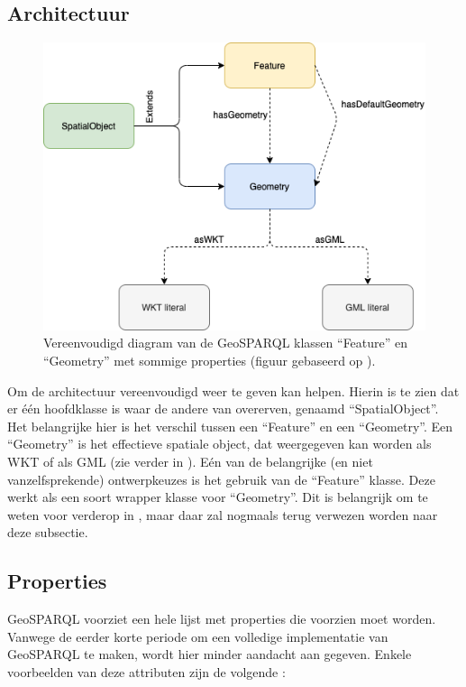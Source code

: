 \subsection{Architectuur}
\label{subsec:geosparql_architecture}
\begin{figure}[ht]
    \centering
    \includegraphics[width=0.7\linewidth]{images/geosparql_architecture.png}
    \caption{Vereenvoudigd diagram van de GeoSPARQL klassen ``Feature'' en ``Geometry'' met sommige properties (figuur gebaseerd op \cite{geosparqlsupport}).}
    \label{fig:geosparql_architecture}
\end{figure}

Om de architectuur vereenvoudigd weer te geven kan  helpen. Hierin is te zien dat er één hoofdklasse is waar de andere van overerven, genaamd ``SpatialObject''. Het belangrijke hier is het verschil tussen een ``Feature'' en een ``Geometry''. Een ``Geometry'' is het effectieve spatiale object, dat weergegeven kan worden als WKT of als GML (zie verder in ). Eén van de belangrijke (en niet vanzelfsprekende) ontwerpkeuzes is het gebruik van de ``Feature'' klasse. Deze werkt als een soort wrapper klasse voor ``Geometry''. Dit is belangrijk om te weten voor verderop in , maar daar zal nogmaals terug verwezen worden naar deze subsectie.

\subsection{Properties}
\label{subsec:geosparql_properties}
GeoSPARQL voorziet een hele lijst met properties die voorzien moet worden. Vanwege de eerder korte periode om een volledige implementatie van GeoSPARQL te maken, wordt hier minder aandacht aan gegeven. Enkele voorbeelden van deze attributen zijn de volgende \cite{ogcdocs}:

